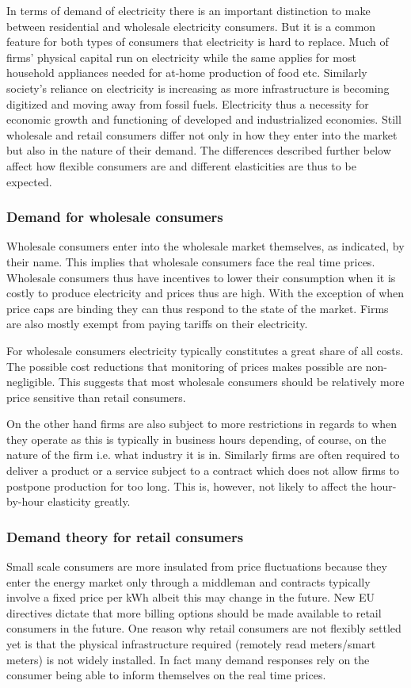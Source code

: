 In terms of demand of electricity there is an important distinction to make between residential and wholesale electricity consumers. But it is a common feature for both types of consumers that electricity is hard to replace. Much of firms' physical capital run on electricity while the same applies for most household appliances needed for at-home production of food etc. Similarly society's reliance on electricity is increasing as more infrastructure is becoming digitized and moving away from fossil fuels. Electricity thus a necessity for economic growth and functioning of developed and industrialized economies. Still wholesale and retail consumers differ not only in how they enter into the market but also in the nature of their demand. The differences described further below affect how flexible consumers are and different elasticities are thus to be expected.

\subsubsection*{Demand for wholesale consumers}
Wholesale consumers enter into the wholesale market themselves, as indicated, by their name. This implies that wholesale consumers face the real time prices. Wholesale consumers thus have incentives to lower their consumption when it is costly to produce electricity and prices thus are high. With the exception of when price caps are binding they can thus respond to the state of the market. Firms are also mostly exempt from paying tariffs on their electricity.
\medskip

For wholesale consumers electricity typically constitutes a great share of all costs. The possible cost reductions that monitoring of prices makes possible are non-negligible. This suggests that most wholesale consumers should be relatively more price sensitive than retail consumers.
\medskip

On the other hand firms are also subject to more restrictions in regards to when they operate as this is typically in business hours depending, of course, on the nature of the firm i.e. what industry it is in. Similarly firms are often required to deliver a product or a service subject to a contract which does not allow firms to postpone production for too long. This is, however, not likely to affect the hour-by-hour elasticity greatly. %

\subsubsection*{Demand theory for retail consumers}
Small scale consumers are more insulated from price fluctuations because they enter the energy market only through a middleman and contracts typically involve a fixed price per kWh albeit this may change in the future. New EU directives dictate that more billing options should be made available to retail consumers in the future. One reason why retail consumers are not flexibly settled yet is that the physical infrastructure required (remotely read meters/smart meters) is not widely installed. In fact many demand responses rely on the consumer being able to inform themselves on the real time prices.
\smallskip \\

